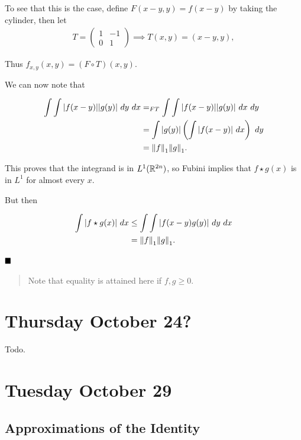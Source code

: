 To see that this is the case, define \(F(x-y, y) = f(x-y)\) by taking
the cylinder, then let
\begin{align*}
T = \left( \begin{array}{cc} 1& -1\\  0 & 1 \end{array}\right) \implies T(x, y) = (x-y, y)
,\end{align*}

Thus \(f_{x,y}(x, y) = (F \circ T)(x, y)\).

We can now note that

\begin{align*}
\int \int {\left\lvert {f(x-y)} \right\rvert} {\left\lvert {g(y)} \right\rvert} ~dy ~dx 
&=_{FT} \int \int {\left\lvert {f(x-y)} \right\rvert} {\left\lvert {g(y)} \right\rvert} ~dx ~dy \\
&= \int {\left\lvert {g(y)} \right\rvert} \left( \int {\left\lvert {f(x-y)} \right\rvert} ~dx \right) ~dy \\
&= {\left\lVert {f} \right\rVert}_1 {\left\lVert {g} \right\rVert}_1
.\end{align*}

This proves that the integrand is in \(L^1({\mathbb{R}}^{2n})\), so Fubini
implies that \(f\star g(x)\) is in \(L^1\) for almost every \(x\).

But then

\begin{align*}
\int {\left\lvert {f\star g(x)} \right\rvert}~dx 
&\leq \int \int {\left\lvert {f(x-y) g(y)} \right\rvert}~dy~dx \\
&= {\left\lVert {f} \right\rVert}_1 {\left\lVert {g} \right\rVert}_1
.\end{align*}

\(\qed\)

\begin{quote}
Note that equality is attained here if \(f, g \geq 0\).
\end{quote}

\hypertarget{thursday-october-24}{%
\section{Thursday October 24?}\label{thursday-october-24}}

Todo.

\hypertarget{tuesday-october-29}{%
\section{Tuesday October 29}\label{tuesday-october-29}}

\hypertarget{approximations-of-the-identity}{%
\subsection{Approximations of the
Identity}\label{approximations-of-the-identity}}

